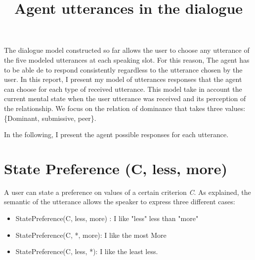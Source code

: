 \documentclass{llncs}
\begin{document}
\title{Agent utterances in the dialogue}
\maketitle 

The dialogue model constructed so far allows the user to choose any utterance of the five modeled utterances at each speaking slot. For this reason, The agent has to be able de to respond consistently regardless to the utterance chosen by the user. In this report, I present my model of utterances responses that the agent can choose for each type of received utterance. This model take in account the current mental state when the user utterance was received and its perception of the relationship. We focus on the relation of dominance that takes three values: \{Dominant, submissive, peer\}.

\par In the following, I present the agent possible responses for each utterance. 
\section{State Preference (C, less, more)}

	\par A user can state a preference on values of a certain criterion \emph{C}. As explained, the semantic of the utterance allows the speaker to express three different cases:
	\begin{itemize}
		\item StatePreference(C, less, more) : I like "less" less than "more"
		\item StatePreference(C, *, more): I like the most More
		\item StatePreference(C, less, *): I like the least less. 
	\end{itemize}
	
\end{document}
